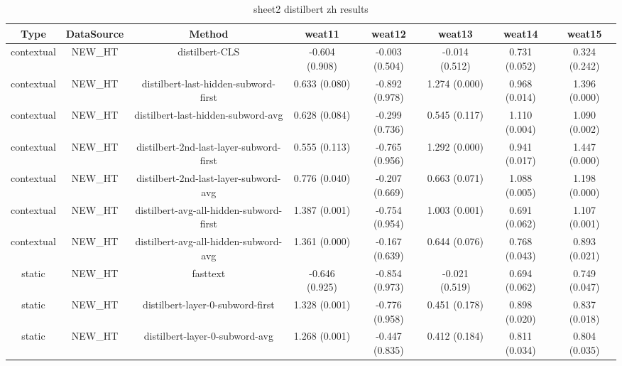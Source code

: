 \begin{sidewaystable}[htb]
    \centering
    \caption{sheet2 distilbert zh results}
    \label{appendix_tab:sheet2_distilbert_zh_results}
    \small
    \begin{tabular}{@{}cccccccc@{}}
        \toprule
        Type & DataSource & Method & weat11 & weat12 & weat13 & weat14 & weat15 \\
        \midrule
        contextual & NEW\_HT & distilbert-CLS & -0.604 (0.908) & -0.003 (0.504) & -0.014 (0.512) & 0.731 (0.052) & 0.324 (0.242) \\
        contextual & NEW\_HT & distilbert-last-hidden-subword-first & 0.633 (0.080) & -0.892 (0.978) & 1.274 (0.000) & 0.968 (0.014) & 1.396 (0.000) \\
        contextual & NEW\_HT & distilbert-last-hidden-subword-avg & 0.628 (0.084) & -0.299 (0.736) & 0.545 (0.117) & 1.110 (0.004) & 1.090 (0.002) \\
        contextual & NEW\_HT & distilbert-2nd-last-layer-subword-first & 0.555 (0.113) & -0.765 (0.956) & 1.292 (0.000) & 0.941 (0.017) & 1.447 (0.000) \\
        contextual & NEW\_HT & distilbert-2nd-last-layer-subword-avg & 0.776 (0.040) & -0.207 (0.669) & 0.663 (0.071) & 1.088 (0.005) & 1.198 (0.000) \\
        contextual & NEW\_HT & distilbert-avg-all-hidden-subword-first & 1.387 (0.001) & -0.754 (0.954) & 1.003 (0.001) & 0.691 (0.062) & 1.107 (0.001) \\
        contextual & NEW\_HT & distilbert-avg-all-hidden-subword-avg & 1.361 (0.000) & -0.167 (0.639) & 0.644 (0.076) & 0.768 (0.043) & 0.893 (0.021) \\
        static & NEW\_HT & fasttext & -0.646 (0.925) & -0.854 (0.973) & -0.021 (0.519) & 0.694 (0.062) & 0.749 (0.047) \\
        static & NEW\_HT & distilbert-layer-0-subword-first & 1.328 (0.001) & -0.776 (0.958) & 0.451 (0.178) & 0.898 (0.020) & 0.837 (0.018) \\
        static & NEW\_HT & distilbert-layer-0-subword-avg & 1.268 (0.001) & -0.447 (0.835) & 0.412 (0.184) & 0.811 (0.034) & 0.804 (0.035) \\
        \bottomrule
    \end{tabular}
\end{sidewaystable}